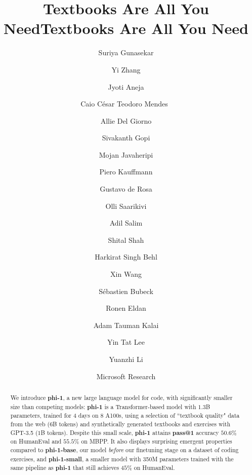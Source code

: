 \title{Textbooks Are All You Need}



\title{Textbooks Are All You Need}

\author{Suriya Gunasekar
\and Yi Zhang
\and Jyoti Aneja
\and Caio C\'esar Teodoro Mendes\
\and Allie Del Giorno
\and Sivakanth Gopi
\and Mojan Javaheripi
\and Piero Kauffmann
\and Gustavo de Rosa
\and Olli Saarikivi
\and Adil Salim
\and Shital Shah
\and Harkirat Singh Behl
\and Xin Wang
\and S\'ebastien Bubeck
\and Ronen Eldan
\and Adam Tauman Kalai
\and Yin Tat Lee
\and Yuanzhi Li}

\date{Microsoft Research}

\maketitle

\begin{abstract}
We introduce \textbf{phi-1}, a new large language model for code, with significantly smaller size than competing models: \textbf{phi-1} is a Transformer-based model with $1.3$B parameters, trained for $4$ days on $8$ A100s, using a selection of ``textbook quality" data from the web ($6$B tokens) and synthetically generated textbooks and exercises with GPT-3.5 ($1$B tokens). Despite this small scale, \textbf{phi-1} attains \textbf{pass@1} accuracy $50.6\%$ on HumanEval and $55.5\%$ on MBPP. It also displays surprising emergent properties compared to \textbf{phi-1-base}, our model {\em before} our finetuning stage on a dataset of coding exercises, and \textbf{phi-1-small}, a smaller model with 350M parameters trained with the same pipeline as \textbf{phi-1} that still achieves $45\%$ on HumanEval.
\end{abstract}

